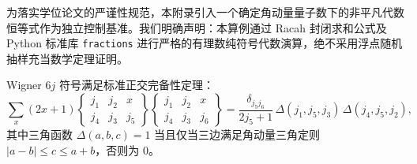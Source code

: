 为落实学位论文的严谨性规范，本附录引入一个确定角动量量子数下的非平凡代数恒等式作为独立控制基准。我们明确声明：本算例通过 Racah 封闭求和公式及 Python 标准库 \texttt{fractions} 进行严格的有理数纯符号代数演算，绝不采用浮点随机抽样充当数学定理证明。

Wigner $6j$ 符号满足标准正交完备性定理：
\begin{equation}\label{eq:appA-6j-ortho-theorem}
\sum_x (2x + 1) \begin{Bmatrix} j_1 & j_2 & x \\ j_4 & j_3 & j_5 \end{Bmatrix} \begin{Bmatrix} j_1 & j_2 & x \\ j_4 & j_3 & j_6 \end{Bmatrix} = \frac{\delta_{j_5 j_6}}{2j_5 + 1} \, \Delta(j_1, j_5, j_3) \, \Delta(j_4, j_5, j_2) ,
\end{equation}
其中三角函数 $\Delta(a, b, c) = 1$ 当且仅当三边满足角动量三角定则 $|a - b| \le c \le a + b$，否则为 0。

